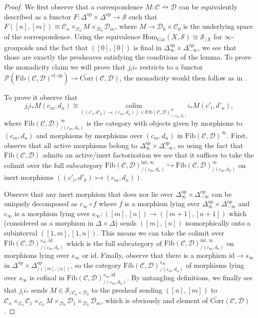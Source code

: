 \documentclass[a4paper, reqno]{amsart}
\theoremstyle{definition}
\newcommand\cC{\mathscr C}
\newcommand\cD{\mathscr D}
\newcommand\cP{\mathscr P}
\newcommand\cS{\mathscr S}
\newcommand\id{\mathrm{id}}
\newcommand\mor{\mathrm{Hom}}
\newcommand\op{\mathrm{op}}
\newcommand\cat{\mathrm{Cat}}
\newcommand\colim{\mathrm{colim}}
\newcommand\corr{\mathrm{Corr}}
\newcommand\fib{\mathrm{Fib}}
\newcommand\inrt{\mathrm{int}}
\newcommand\el{\mathrm{el}}
\begin{document}
\begin{proof}
We first observe that a correspondence $M:\cC\nrightarrow\cD$ can be equivalently described as a functor $F:\Delta^\op\times\Delta^\op\rightarrow\cS$ such that $F([n],[m])\cong \cC_n\times_{\cC_0}M\times_{\cD_0}\cD_m$, where $M\rightarrow\cD_0\times\cC_0$ is the underlying space of the correspondence. Using the equivalence $\mor_\cat(X,\cS)\cong\cS_{/X}$ for $\infty$-groupoids and the fact that $([0],[0])$ is final in $\Delta^\op_\infty\times\Delta^\op_{-\infty}$, we see that those are exactly the presheaves satisfying the conditions of the lemma. To prove the monadicity claim we will prove that $j_!i_*$ restricts to a functor $\cP(\fib(\cC,\cD)^{\el,\op})\rightarrow\widetilde{\corr}(\cC,\cD)$, the monadicity would then follow as in \cite[Proposition 8.1]{chu2019homotopy}.\par
To prove it observe that 
\[j_!i_*M(c_m,d_n)\cong\underset{((c'_l,d'_k)\rightarrow(c_m,d_n))\in\fib(\cC,\cD)^\infty_{/(c_m,d_n)}}{\colim}i_*M(c'_l,d'_n),\]
where $\fib(\cC,\cD)^\infty_{/(c_m,d_n)}$ is the category with objects given by morphisms to $(c_m,d_n)$ and morphisms by morphisms over $(c_m,d_n)$ in $\fib(\cC,\cD)^\infty$. First, observe that all active morphisms belong to $\Delta^\op_\infty\times\Delta^\op_{-\infty}$, so using the fact that $\fib(\cC,\cD)$ admits an active/inert factorization we see that it suffices to take the colimit over the full subcategory $\fib(\cC,\cD)^{\inrt,\infty}_{/(c_m,d_n)}\hookrightarrow\fib(\cC,\cD)^{\infty}_{/(c_m,d_n)}$ on inert morphisms $((c'_l,d'_k)\rightarrowtail(c_m,d_n))$.\par
Observe that any inert morphism that does nor lie over $\Delta^\op_\infty\times\Delta^\op_{-\infty}$ can be uniquely decomposed as $c_\infty\circ f$ where $f$ is a morphism lying over $\Delta^\op_\infty\times\Delta^\op_{-\infty}$ and $c_\infty$ is a morphism lying over $s_\infty:([m],[n])\rightarrow([m+1],[n+1])$ which (considered as a morphism in $\Delta\times\Delta$) sends $([m],[n])$ isomorphically onto a subinterval $([1,m],[1,n])$. This means we can take the colimit over $\fib(\cC,\cD)^{s_\infty,\id}_{/(c_m,d_n)}$ which is the full subcategory of $\fib(\cC,\cD)^{\inrt,\infty}_{/(c_m,d_n)}$ on morphisms lying over $s_\infty$ or $\id$. Finally, observe that there is a morphism $\id\rightarrow s_\infty$ in $\Delta^\op\times\Delta^\op_{/([m],[n])}$, so the category $\fib(\cC,\cD)^{s_\infty}_{/(c_m,d_n)}$ of morphisms lying over $s_\infty$ is cofinal in $\fib(\cC,\cD)^{s_\infty,\id}_{/(c_m,d_n)}$. By untangling definitions, we finally see that $j_!i_*$ sends $M\in\cS_{/\cC_0\times\cD_0}$ to the presheaf sending $([n],[m])$ to $\cC_n\times_{\cC_0}\cC_1\times_{\cC_0}M\times_{\cD_0}\cD_1\times_{\cD_0}\cD_m$, which is obviously and element of $\widetilde{\corr}(\cC,\cD)$.
\end{proof}
\end{document}
